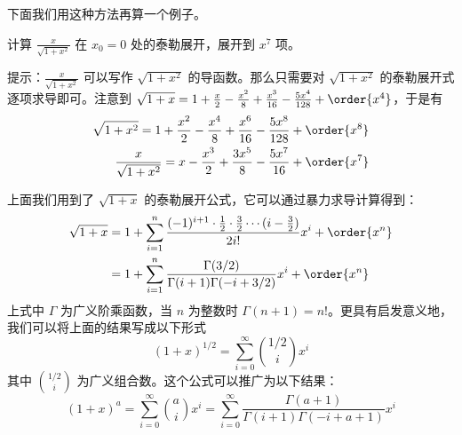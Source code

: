 下面我们用这种方法再算一个例子。
\begin{exercise}{}
计算 $\frac{x}{\sqrt{1+x^2}}$ 在 $x_0=0$ 处的泰勒展开，展开到 $x^7$ 项。
\end{exercise}
提示：$\frac{x}{\sqrt{1+x^2}}$ 可以写作 $\sqrt{1+x^2}$ 的导函数。那么只需要对 $\sqrt{1+x^2}$ 的泰勒展开式逐项求导即可。注意到 $\sqrt{1+x}=1+\frac{x}{2}-\frac{x^2}{8}+\frac{x^3}{16}-\frac{5x^4}{128}+\order{x^4}$，于是有
\begin{equation}
\begin{aligned}
\sqrt{1+x^2}=1+\frac{x^2}{2}-\frac{x^4}{8}+\frac{x^6}{16}-\frac{5x^8}{128}+\order{x^8}\\
\frac{x}{\sqrt{1+x^2}}=x-\frac{x^3}{2}+\frac{3x^5}{8}-\frac{5x^7}{16}+\order{x^7}
\end{aligned}
\end{equation}

上面我们用到了 $\sqrt{1+x}$ 的泰勒展开公式，它可以通过暴力求导计算得到：
\begin{equation}
\begin{aligned}
\sqrt{1+x}&=1+\sum_{i=1}^n\frac{(-1)^{i+1} \cdot \frac{1}{2}\cdot \frac{3}{2}\cdots (i-\frac{3}{2})}{2i!}x^i +\order{x^n}\\
&=1+\sum_{i=1}^n\frac{\Gamma(3/2)}{\Gamma(i+1)\Gamma(-i+3/2)}x^i +\order{x^n}
\end{aligned}
\end{equation}
上式中 $\Gamma$ 为广义阶乘函数，当 $n$ 为整数时 $\Gamma(n+1)=n!$。更具有启发意义地，我们可以将上面的结果写成以下形式
\begin{equation}
(1+x)^{1/2}=\sum_{i=0}^{\infty}{1/2\choose i}x^i
\end{equation}
其中 ${1/2\choose i}$ 为广义组合数。这个公式可以推广为以下结果：
\begin{equation}
(1+x)^{a}=\sum_{i=0}^{\infty}{a\choose i}x^i=\sum_{i=0}^{\infty}\frac{\Gamma(a+1)}{\Gamma(i+1)\Gamma(-i+a+1)}x^i
\end{equation}

